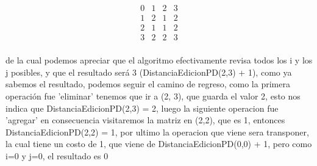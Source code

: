 \begin{equation}
\begin{matrix}
    0 & 1 & 2 & 3 \\
    1 & 2 & 1 & 2 \\
    2 & 1 & 1 & 2 \\
    3 & 2 & 2 & 3 \\
\end{matrix}
\end{equation}

de la cual podemos apreciar que el algoritmo efectivamente revisa todos los i y los j posibles, y que el resultado será 3 (DistanciaEdicionPD(2,3) + 1), como ya sabemos el resultado, podemos seguir el camino de regreso, como la primera operación fue 'eliminar' tenemos que ir a (2, 3), que guarda el valor 2, esto nos indica que DistanciaEdicionPD(2,3) = 2, luego la siguiente operacion fue 'agregar' en consecuencia visitaremos la matriz en (2,2), que es 1, entonces DistanciaEdicionPD(2,2) = 1, por ultimo la operacion que viene sera transponer, la cual tiene un costo de 1, que viene de DistanciaEdicionPD(0,0) + 1, pero como i=0 y j=0, el resultado es 0